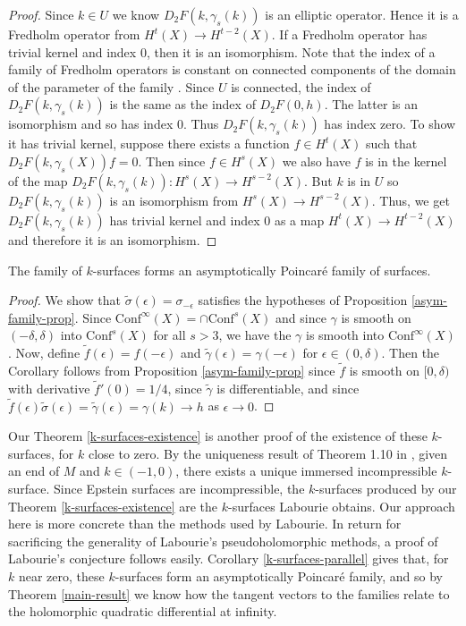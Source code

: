 \begin{proof}
Since $k \in U$ we know $D_2F(k,\gamma_s(k))$ is an elliptic operator. 
Hence it is a Fredholm operator from $H^t(X) \to H^{t-2}(X)$. 
If a Fredholm operator has trivial kernel and index 0, then it is an isomorphism. 
Note that the index of a family of Fredholm operators is constant on connected components of the domain of the parameter of the family \cite[Section 3.7]{lawson-michelsohn1989}. 
Since $U$ is connected, the index of $D_2F(k,\gamma_s(k))$ is the same as the index of $D_2F(0,h)$. 
The latter is an isomorphism and so has index 0. 
Thus $D_2F(k,\gamma_s(k))$ has index zero. 
To show it has trivial kernel, suppose there exists a function $f \in H^t(X)$ such that $D_2F(k,\gamma_s(X))f = 0$. 
Then since $f \in H^s(X)$ we also have $f$ is in the kernel of the map $D_2F(k,\gamma_s(k)): H^s(X) \to H^{s-2}(X)$. 
But $k$ is in $U$ so $D_2F(k,\gamma_s(k))$ is an isomorphism from $H^s(X) \to H^{s-2}(X)$. 
Thus, we get $D_2F(k,\gamma_s(k))$ has trivial kernel and index 0 as a map $H^t(X) \to H^{t-2}(X)$ and therefore it is an isomorphism. 

\end{proof}


\begin{cor}
\label{k-surfaces-parallel}
The family of $k$-surfaces forms an asymptotically Poincar\'e family of surfaces. 
\label{k-surfaces-cor}
\end{cor}

\begin{proof}
We show that $\tilde{\sigma}(\epsilon) = \sigma_{-\epsilon}$ satisfies the hypotheses of Proposition \ref{asym-family-prop}. 
Since $\mathrm{Conf}^\infty(X) = \cap \mathrm{Conf}^s(X)$ and since $\gamma$ is smooth on $(-\delta,\delta)$ into $\mathrm{Conf}^s(X)$ for all $s > 3$, we have the $\gamma$ is smooth into $\mathrm{Conf}^\infty(X)$.
Now, define $\tilde{f}(\epsilon) = f(- \epsilon)$ and $\tilde{\gamma}(\epsilon) = \gamma(-\epsilon)$ for $\epsilon \in (0,\delta)$. 
Then the Corollary follows from Proposition \ref{asym-family-prop} since $\tilde{f}$ is smooth on $[0,\delta)$ with derivative $\tilde{f}'(0) = 1/4$, since $\tilde{\gamma}$ is differentiable, and since $\tilde{f}(\epsilon) \tilde{\sigma}(\epsilon) = \tilde{\gamma}(\epsilon) = \gamma(k) \to h$ as $\epsilon \to 0$.
\end{proof}


Our Theorem \ref{k-surfaces-existence} is another proof of the existence of these $k$-surfaces, for $k$ close to zero. 
By the uniqueness result of Theorem 1.10 in \cite{labourie1992}, given an end of $M$ and $k \in (-1,0)$, there exists a unique immersed incompressible $k$-surface. 
Since Epstein surfaces are incompressible, the $k$-surfaces produced by our Theorem \ref{k-surfaces-existence} are the $k$-surfaces Labourie obtains. 
Our approach here is more concrete than the methods used by Labourie. 
In return for sacrificing the generality of Labourie's pseudoholomorphic methods, a proof of Labourie's conjecture follows easily. 
Corollary \ref{k-surfaces-parallel} gives that, for $k$ near zero, these $k$-surfaces form an asymptotically Poincar\'e family, and so by Theorem \ref{main-result} we know how the tangent vectors to the families relate to the holomorphic quadratic differential at infinity. 

